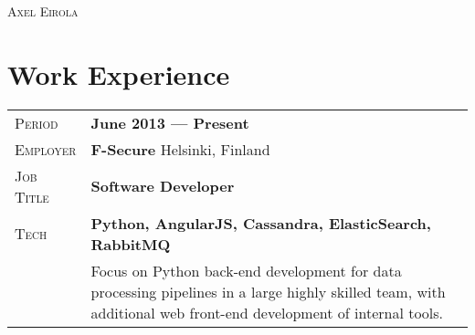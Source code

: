 \documentclass[a4paper, oneside, final]{scrartcl} %
\newcommand{\gray}{\rowcolor[gray]{.90}} %
\begin{document}
\begin{center} %


{\fontsize{36}{36}\selectfont\scshape Axel Eirola} %

\vspace{0.2cm} %





\section{Work Experience}

\begin{tabularx}{0.97\linewidth}{>{\raggedleft\scshape}p{2cm}X}
\gray Period & \textbf{June 2013 --- Present}\\
\gray Employer & \textbf{F-Secure} \hfill Helsinki, Finland\\
\gray Job Title & \textbf{Software Developer}\\
\gray Tech & \textbf{Python, AngularJS, Cassandra, ElasticSearch, RabbitMQ}\\
       & Focus on Python back-end development for data processing pipelines in a large highly skilled team, with additional web front-end development of internal tools.
\end{tabularx}

\vspace{12pt}


\end{center}
\end{document}

